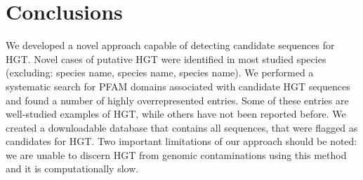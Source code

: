 \section{Conclusions}
We developed a novel approach capable of detecting candidate sequences for HGT.
Novel cases of putative HGT were identified in most studied species (excluding:
species name, species name, species name). We performed a systematic search for
PFAM domains associated with candidate HGT sequences and found a number of
highly overrepresented entries. Some of these entries are well-studied examples
of HGT, while others have not been reported before. We created a downloadable
database that contains all sequences, that were flagged as candidates for HGT.
Two important limitations of our approach should be noted: we are unable to
discern HGT from genomic contaminations using this method and it is
computationally slow.
